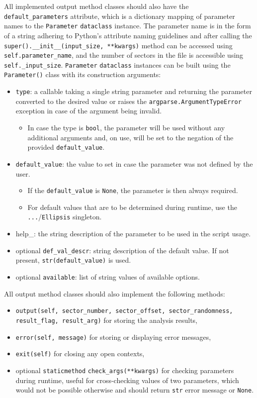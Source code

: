 \documentclass[
  digital, %
  color,   %
  oneside, %
  lof,     %
  nolot,     %
]{fithesis4}
\begin{document}
All implemented output method classes should also have the \texttt{default\_parameters} attribute, which is a dictionary mapping of parameter names to the \texttt{Parameter} \texttt{dataclass} instance.
The parameter name is in the form of a string adhering to Python's attribute naming guidelines and after calling the \texttt{super().\_\_init\_\_(input\_size, **kwargs)} method can be accessed using \texttt{self.parameter\_name}, and the number of sectors in the file is accessible using \texttt{self.\_input\_size}. \texttt{Parameter} \texttt{dataclass} instances can be built using the \texttt{Parameter()} class with its construction arguments:
\begin{itemize}
  \item \texttt{type}: a callable taking a single string parameter and returning the parameter converted to the desired value or raises the \texttt{argparse.ArgumentTypeError} exception in case of the argument being invalid.
    \begin{itemize}
      \item In case the type is \texttt{bool}, the parameter will be used without any additional arguments and, on use, will be set to the negation of the provided \texttt{default\_value}.
    \end{itemize}
  \item \texttt{default\_value}: the value to set in case the parameter was not defined by the user.
    \begin{itemize}
      \item If the \texttt{default\_value} is \texttt{None}, the parameter is then always required.
      \item For default values that are to be determined during runtime, use the \texttt{...}/\texttt{Ellipsis} singleton.
    \end{itemize}
  \item help\_: the string description of the parameter to be used in the script usage.
  \item optional \texttt{def\_val\_descr}: string description of the default value. 
    If not present, \texttt{str(default\_value)} is used.
  \item optional \texttt{available}: list of string values of available options.
\end{itemize}

All output method classes should also implement the following methods:
\begin{itemize}
    \item \texttt{output(self, sector\_number, sector\_offset, sector\_randomness, result\_flag, result\_arg)} for storing the analysis results,
    \item \texttt{error(self, message)} for storing or displaying error messages,
    \item \texttt{exit(self)} for closing any open contexts,
    \item optional \texttt{staticmethod} \texttt{check\_args(**kwargs)} for checking parameters during runtime, useful for cross-checking values of two parameters, which would not be possible otherwise and should return \texttt{str} error message or \texttt{None}.
\end{itemize}
\end{document}
